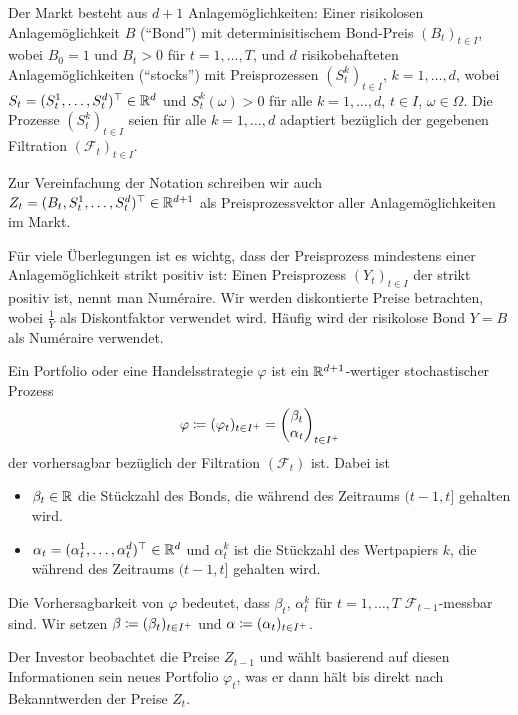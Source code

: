 \documentclass[a4paper,twoside,DIV15,BCOR12mm]{scrbook}
\newcommand{\cF}{\mathcal F}
\begin{document}
Der Markt besteht aus $d+1$ Anlagemöglichkeiten: Einer risikolosen Anlagemöglichkeit $B$ (“Bond”) mit determinisitischem Bond-Preis $(B_t)_{t\in I}$, wobei $B_0=1$ und $B_t>0$ für $t=1,\ldots,T$, und $d$ risikobehafteten Anlagemöglichkeiten (“stocks”) mit Preisprozessen $(S_t^k)_{t\in I}$, $k=1,\ldots,d$, wobei $S_t=(S_t^1,\ldots,S_t^d)^\top\in \mathbb{R}^d$ und $S_t^k(\omega)>0$ für alle $k=1,\ldots,d$, $t\in I$, $\omega\in \Omega$. Die Prozesse $(S_t^k)_{t\in I}$ seien für alle $k=1,\ldots,d$ adaptiert bezüglich der gegebenen Filtration $(\cF_t)_{t\in I}$.

Zur Vereinfachung der Notation schreiben wir auch $Z_t = (B_t, S_t^1, \ldots , S_t^d)^\top\in\mathbb{R}^{d+1}$ als Preisprozessvektor aller Anlagemöglichkeiten im Markt.

Für viele Überlegungen ist es wichtg, dass der Preisprozess mindestens einer Anlagemöglichkeit strikt positiv ist:  Einen Preisprozess $(Y_t)_{t\in I}$ der strikt positiv ist, nennt man Numéraire. Wir werden diskontierte Preise betrachten, wobei $\frac 1Y$ als Diskontfaktor verwendet wird. Häufig wird der risikolose Bond $Y=B$ als Numéraire verwendet.

\begin{definition}
Ein Portfolio oder eine Handelsstrategie $\varphi$ ist ein $\mathbb{R}^{d+1}$-wertiger stochastischer Prozess 
\[
\varphi \da (\varphi_t)_{t\in I^+} = 
\begin{pmatrix}
\beta_t \\ \alpha _t
\end{pmatrix}_{t\in I^+}
\]
der vorhersagbar bezüglich der Filtration $(\cF_t)$ ist. Dabei ist
\begin{itemize}
\item $\beta_t\in\mathbb{R}$ die Stückzahl des Bonds, die während des Zeitraums $(t-1,t]$ gehalten wird.
\item $\alpha_t = (\alpha_t^1,\ldots, \alpha_t^d)^\top \in\mathbb{R}^d$ und $\alpha_t^k$ ist die Stückzahl des Wertpapiers $k$, die während des Zeitraums $(t-1,t]$ gehalten wird.
\end{itemize}
Die Vorhersagbarkeit von $\varphi$ bedeutet, dass $\beta_t$, $\alpha_t^k$ für $t=1,\ldots,T$ $\cF_{t-1}$-messbar sind. Wir setzen
$\beta \da (\beta_t)_{t\in I^+}$ und $\alpha \da (\alpha_t)_{t\in I^+}$.
\end{definition}

Der Investor beobachtet die Preise $Z_{t-1}$ und wählt basierend auf diesen Informationen sein neues Portfolio $\varphi_t$, was er dann hält bis direkt nach Bekanntwerden der Preise $Z_t$.
\end{document}
